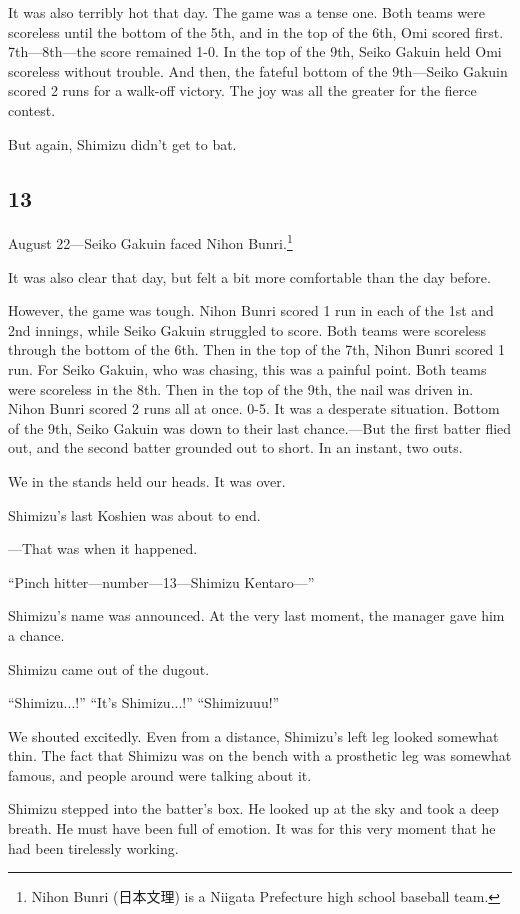 \documentclass[
    a4paper,
    12pt,
    twoside,
    openany,
    UTF8,
    fontset=windows
]{ctexbook}
\begin{document}
It was also terribly hot that day. The game was a tense one. Both teams were scoreless until the bottom of the 5th, and in the top of the 6th, Omi scored first. 7th---8th---the score remained 1-0. In the top of the 9th, Seiko Gakuin held Omi scoreless without trouble. And then, the fateful bottom of the 9th---Seiko Gakuin scored 2 runs for a walk-off victory. The joy was all the greater for the fierce contest.

But again, Shimizu didn't get to bat.


\subsection*{13}

August 22---Seiko Gakuin faced Nihon Bunri.\footnote{Nihon Bunri (日本文理) is a Niigata Prefecture high school baseball team.}

It was also clear that day, but felt a bit more comfortable than the day before.

However, the game was tough. Nihon Bunri scored 1 run in each of the 1st and 2nd innings, while Seiko Gakuin struggled to score. Both teams were scoreless through the bottom of the 6th. Then in the top of the 7th, Nihon Bunri scored 1 run. For Seiko Gakuin, who was chasing, this was a painful point. Both teams were scoreless in the 8th. Then in the top of the 9th, the nail was driven in. Nihon Bunri scored 2 runs all at once. 0-5. It was a desperate situation. Bottom of the 9th, Seiko Gakuin was down to their last chance.---But the first batter flied out, and the second batter grounded out to short. In an instant, two outs.

We in the stands held our heads. It was over.

Shimizu's last Koshien was about to end.

---That was when it happened.

``Pinch hitter---number---13---Shimizu Kentaro---''

Shimizu's name was announced. At the very last moment, the manager gave him a chance.

Shimizu came out of the dugout.

``Shimizu...!'' ``It's Shimizu...!'' ``Shimizuuu!''

We shouted excitedly. Even from a distance, Shimizu's left leg looked somewhat thin. The fact that Shimizu was on the bench with a prosthetic leg was somewhat famous, and people around were talking about it.

Shimizu stepped into the batter's box. He looked up at the sky and took a deep breath. He must have been full of emotion. It was for this very moment that he had been tirelessly working.
\end{document}
